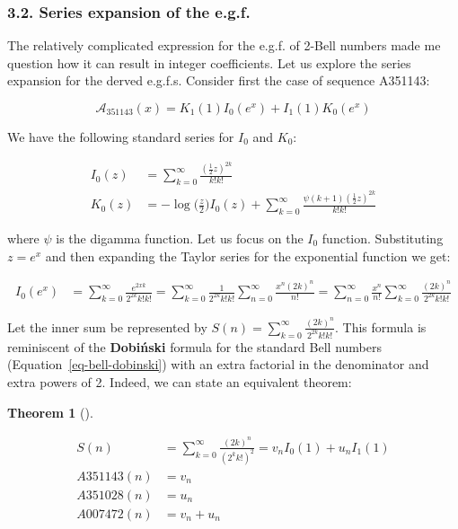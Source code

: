 \documentclass[
  letterpaper,
  DIV=11,
  numbers=noendperiod]{scrartcl}
\theoremstyle{plain}
\newtheorem{theorem}{Theorem}[section]
\theoremstyle{remark}
\begin{document}
\subsubsection{3.2. Series expansion of the
e.g.f.}\label{series-expansion-of-the-e.g.f.}

The relatively complicated expression for the e.g.f. of 2-Bell numbers
made me question how it can result in integer coefficients. Let us
explore the series expansion for the derved e.g.f.s. Consider first the
case of sequence A351143:

\[
\mathcal{A}_{351143}(x) = K_1(1)I_0(e^x) + I_1(1)K_0(e^x)
\]

We have the following standard series for \(I_0\) and \(K_0\):

\[
\begin{aligned}
I_0(z) &= \sum_{k=0}^{\infty} \frac{(\frac{1}{2}z)^{2k}}{k!k!} \\
K_0(z) &= -\log\biggl(\frac{z}{2}\biggr)I_0(z) + \sum_{k=0}^{\infty}\frac{\psi(k+1)(\frac{1}{2}z)^{2k}}{k!k!}
\end{aligned}
\]

where \(\psi\) is the digamma function. Let us focus on the \(I_0\)
function. Substituting \(z=e^x\) and then expanding the Taylor series
for the exponential function we get:

\[
\begin{aligned}
I_0(e^x) &= \sum_{k=0}^{\infty} \frac{e^{2xk}}{2^{2k}k!k!} = \sum_{k=0}^{\infty} \frac{1}{2^{2k}k!k!}\sum_{n=0}^{\infty}\frac{x^n(2k)^n}{n!} = \sum_{n=0}^{\infty}\frac{x^n}{n!}\sum_{k=0}^{\infty} \frac{(2k)^n}{2^{2k}k!k!}
\end{aligned}
\]

Let the inner sum be represented by
\(S(n) = \sum_{k=0}^{\infty} \frac{(2k)^n}{2^{2k}k!k!}\). This formula
is reminiscent of the \textbf{Dobiński} formula for the standard Bell
numbers (Equation~\ref{eq-bell-dobinski}) with an extra factorial in the
denominator and extra powers of 2. Indeed, we can state an equivalent
theorem:

\begin{theorem}[]\protect\hypertarget{thm-bessel-dobiski}{}\label{thm-bessel-dobiski}

\[
\begin{aligned}
S(n) &= \sum_{k=0}^{\infty} \frac{(2k)^n}{(2^{k}k!)^2}=v_n I_0(1) + u_n I_1(1) \\
A351143(n) &= v_n \\
A351028(n) &= u_n \\
A007472(n) &= v_n+u_n
\end{aligned}
\]

\end{theorem}
\end{document}
